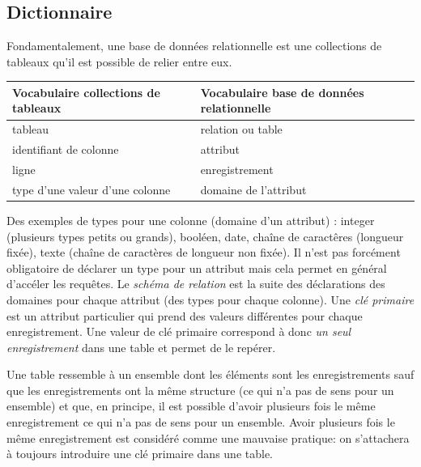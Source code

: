 \subsection{Dictionnaire}
Fondamentalement, une base de données relationnelle est une collections de tableaux qu'il est possible de relier entre eux.
\begin{center}
\begin{tabular}{l|l}
Vocabulaire collections de tableaux & Vocabulaire base de données relationnelle \\ \hline
 tableau & relation ou table \\
 identifiant de colonne & attribut \\
 ligne & enregistrement \\
 type d'une valeur d'une colonne & domaine de l'attribut
\end{tabular}
\end{center}
Des exemples de types pour une colonne (domaine d'un attribut) : integer (plusieurs types petits ou grands), booléen, date, chaîne de caractêres (longueur fixée), texte (chaîne de caractères de longueur non fixée).
Il n'est pas forcément obligatoire de déclarer un type pour un attribut mais cela permet en général d'accéler les requêtes.\newline
{} Le \emph{schéma de relation} est la suite des déclarations des domaines pour chaque attribut (des types pour chaque colonne).\newline
{}Une \emph{clé primaire} est un attribut particulier qui prend des valeurs différentes pour chaque enregistrement. Une valeur de clé primaire correspond à donc \emph{un seul enregistrement} dans une table et permet de le repérer.

Une table ressemble à un ensemble dont les éléments sont les enregistrements sauf que les enregistrements ont la même structure (ce qui n'a pas de sens pour un ensemble) et que, en principe, il est possible d'avoir plusieurs fois le même enregistrement ce qui n'a pas de sens pour un ensemble. Avoir plusieurs fois le même enregistrement est considéré comme une mauvaise pratique: on s'attachera à toujours introduire une clé primaire dans une table.

